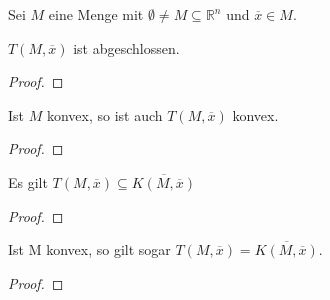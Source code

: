 
Sei $M$ eine Menge mit $\emptyset\neq M\subseteq \mathbb R^n$ und $\overline x\in M$.

\begin{compactenum}[(i)]
\item $T(M,\overline x)$ ist abgeschlossen.
\begin{proof}
\end{proof}
\item Ist $M$ konvex, so ist auch $T(M,\overline x)$ konvex.
\begin{proof}
\end{proof}
\item Es gilt $T(M,\overline x)\subseteq \overline{K(M,\overline x)}$
\begin{proof}
\end{proof}
\item Ist M konvex, so gilt sogar $T(M,\overline x)=\overline{K(M,\overline x)}$.
\begin{proof}
\end{proof}
\end{compactenum}
